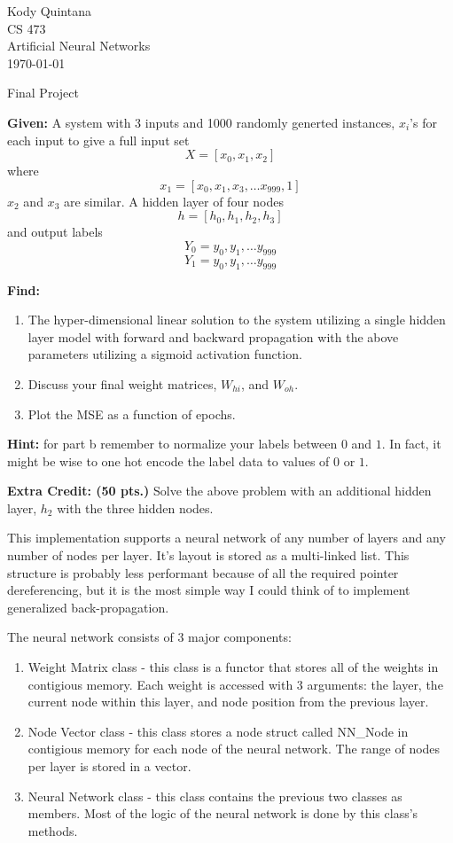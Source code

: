 \documentclass[14pt]{article}
\begin{document}
\begin{flushleft}
 
\large
Kody Quintana\\
CS 473\\
Artificial Neural Networks\\
\today\\
\boldmath

\begin{center}
Final Project
\end{center}

\question
\textbf{Given:}
	A system with 3 inputs and 1000 randomly generted instances, $x_i$'s
	for each input to give a full input set
	\[X = [x_0, x_1, x_2] \]
	where
	\[x_1 = [x_0, x_1, x_3, \ldots x_{999}, 1]\]
	$x_2$ and $x_3$ are similar.
	A hidden layer of four nodes
	\[h = [h_0, h_1, h_2, h_3]\]
	and output labels
	\[Y_0 = y_0, y_1, \ldots y_{999}\]
	\[Y_1 = y_0, y_1, \ldots y_{999}\]
	
\textbf{Find:}
	\begin{enumerate}
	\item The hyper-dimensional linear solution to the system utilizing a single hidden layer model
		with forward and backward propagation with the above parameters
		utilizing a sigmoid activation function.
	\item Discuss your final weight matrices, $W_{hi}$, and $W_{oh}$.
	\item Plot the MSE as a function of epochs.
	\end{enumerate}

\textbf{Hint:}
	for part b remember to normalize your labels between $0$ and $1$.
	In fact, it might be wise to one hot encode the label data to values of $0$ or $1$.
\closequestion

\question
\textbf{Extra Credit: (50 pts.)}
	Solve the above problem with an additional hidden layer, $h_2$ with the three hidden nodes.
\closequestion

\newpage
This implementation supports a neural network of any number of layers and any number of nodes per layer.
It's layout is stored as a multi-linked list.		
This structure is probably less performant because of all the required pointer dereferencing,
but it is the most simple way I could think of to implement generalized back-propagation.

The neural network consists of 3 major components:
\begin{enumerate}
	\item Weight Matrix class - this class is a functor that stores all of the weights in contigious memory.
		Each weight is accessed with 3 arguments:
		the layer, the current node within this layer, and node position from the previous layer.
	\item Node Vector class - this class stores a node struct called NN\_Node in contigious memory
		for each node of the neural network. The range of nodes per layer is stored in a vector.
	\item Neural Network class - this class contains the previous two classes as members.
		Most of the logic of the neural network is done by this class's methods.
\end{enumerate}


\end{flushleft}
\end{document}
